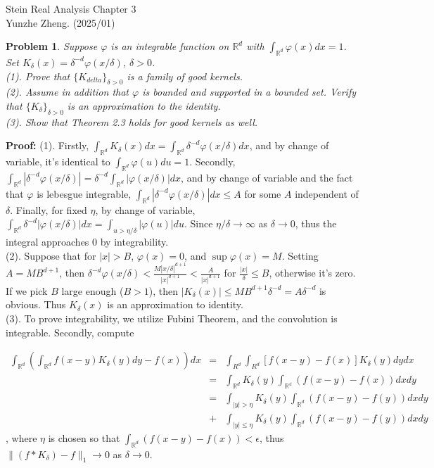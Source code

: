 \documentclass[12pt]{article}
\newtheorem{problem}{Problem}
\begin{document}
\noindent Stein Real Analysis \hfill Chapter 3\\
Yunzhe Zheng. (2025/01)

\hrulefill

\begin{problem}
Suppose $\varphi$ is an integrable function on $\mathbb{R}^{d}$ with $\int_{\mathbb{R}^{d}}\varphi(x)dx = 1$. Set $K_{\delta}(x) = \delta^{-d}\varphi(x/\delta)$, $\delta > 0$. \\

(1). Prove that $\{K_{delta}\}_{\delta>0}$ is a family of good kernels. \\
\indent (2). Assume in addition that $\varphi$ is bounded and supported in a bounded set. Verify that $\{K_{\delta}\}_{\delta>0}$ is an approximation to the identity. \\
\indent (3). Show that Theorem 2.3 holds for good kernels as well.
\end{problem}

\textbf{Proof:} (1). Firstly, $\int_{\mathbb{R}^{d}}K_{\delta}(x)dx = \int_{\mathbb{R}^{d}}\delta^{-d}\varphi(x/\delta)dx$, and by change of variable, it's identical to $\int_{\mathbb{R}^{d}}\varphi(u)du = 1$. Secondly, $\int_{\mathbb{R}^{d}}\left | \delta^{-d} \varphi(x/\delta)\right | = \delta^{-d}\int_{\mathbb{R}^{d}}|\varphi(x/\delta)|dx$, and by change of variable and the fact that $\varphi$ is lebesgue integrable, $\int_{\mathbb{R}^{d}}|\delta^{-d}\varphi(x/\delta)|dx \leq A$ for some $A$ independent of $\delta$. Finally, for fixed $\eta$,  by change of variable, $\int_{\mathbb{R}^{d}}\delta^{-d}|\varphi(x/\delta)|dx = \int_{u>\eta / \delta}|\varphi(u)|du$. Since $\eta / \delta\to\infty$ as $\delta\to 0$, thus the integral approaches 0 by integrability. \\

(2). Suppose that for $|x| > B$, $\varphi(x) = 0$, and $\sup\varphi(x) = M$. Setting $A = MB^{d+1}$, then $\delta^{-d}\varphi(x/\delta)< \frac{M|x/\delta|^{d+1}}{|x|^{d+1}} < \frac{A}{|x|^{d+1}}$ for $\frac{|x|}{\delta}\leq B$, otherwise it's zero. If we pick $B$ large enough ($B > 1$), then $|K_{\delta}(x)| \leq MB^{d+1}\delta^{-d} = A\delta^{-d}$ is obvious. Thus $K_{\delta}(x)$ is an approximation to identity. \\

(3). To prove integrability, we utilize Fubini Theorem, and the convolution is integrable. Secondly, compute

\begin{eqnarray*}
\int_{\mathbb{R}^{d}}(\int_{\mathbb{R}^{d}}f(x-y)K_{\delta}(y)dy - f(x))dx 
&=& \int_{R^{d}}\int_{R^{d}}\left [ f(x-y) - f(x)\right]K_{\delta}(y)dydx \\
&=& \int_{\mathbb{R}^{d}}K_{\delta}(y)\int_{\mathbb{R^{d}}}(f(x-y) - f(x))dxdy \\
&=& \int_{|y| > \eta}K_{\delta}(y)\int_{\mathbb{R}^{d}}(f(x-y) - f(y))dxdy \\
&+& \int_{|y|\leq \eta}K_{\delta}(y)\int_{\mathbb{R}^{d}}(f(x-y)  - f(y))dxdy 
\end{eqnarray*}, where $\eta$ is chosen so that $\int_{\mathbb{R}^{d}}(f(x - y) - f(x))<\epsilon$, thus $\|(f \ast K_{\delta}) - f\|_{1}\to 0$ as $\delta\to 0$.
\end{document}
